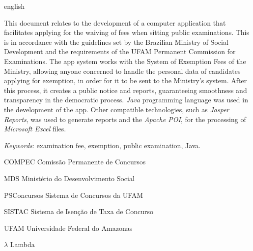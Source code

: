 \documentclass[
	12pt,			%
	openright,		%
	oneside,	
	a4paper,		%
	english,		%
	brazil			%
]{abntex2/abntex2}  %
\begin{document}
\begin{abstracteng}[Abstract]
 \begin{otherlanguage*}{english}
 	
 	This document relates to the development of a computer application that facilitates applying for the waiving of fees when sitting public examinations. This is in accordance with the guidelines set by the Brazilian Ministry of Social Development and the requirements of the UFAM Permanent Commission for Examinations. The app system works with the System of Exemption Fees of the Ministry, allowing anyone concerned to handle the personal data of candidates applying for exemption, in order for it to be sent to the Ministry's system. After this process, it creates a public notice and reports, guaranteeing smoothness and transparency in the democratic process. \textit{Java} programming language was used in the development of the app. Other compatible technologies, such as \textit{Jasper Reports}, was used to generate reports and the \textit{Apache POI}, for the processing of \textit{Microsoft Excel} files.

   \vspace{\onelineskip}
 
   \noindent 
   \textit{Keywords}: examination fee, exemption, public examination, Java.
   
 \end{otherlanguage*}
\end{abstracteng}

\listoffigures*
\cleardoublepage

\listoftables*
\cleardoublepage

\begin{siglas}
  \item[COMPEC] Comissão Permanente de Concursos
  \item[MDS] Ministério do Desenvolvimento Social
  \item[PSConcursos] Sistema de Concursos da UFAM
  \item[SISTAC] Sistema de Isenção de Taxa de Concurso
  \item[UFAM] Universidade Federal do Amazonas
\end{siglas}

\begin{simbolos}
  \item[$ \lambda $] Lambda
\end{simbolos}
\end{document}
